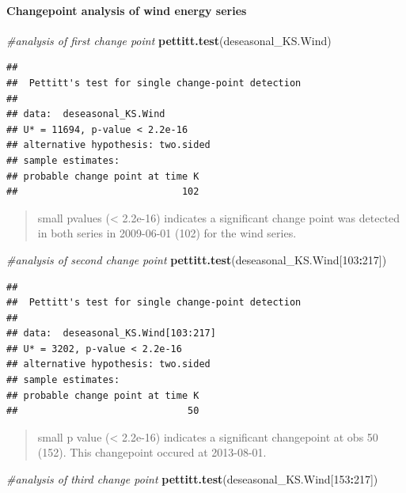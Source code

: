 \documentclass[12pt,]{article}
\newenvironment{Shaded}{\begin{snugshade}}{\end{snugshade}}
\newcommand{\KeywordTok}[1]{\textcolor[rgb]{0.13,0.29,0.53}{\textbf{#1}}}
\newcommand{\DecValTok}[1]{\textcolor[rgb]{0.00,0.00,0.81}{#1}}
\newcommand{\CommentTok}[1]{\textcolor[rgb]{0.56,0.35,0.01}{\textit{#1}}}
\newcommand{\OperatorTok}[1]{\textcolor[rgb]{0.81,0.36,0.00}{\textbf{#1}}}
\newcommand{\NormalTok}[1]{#1}
\let\oldparagraph\paragraph
\renewcommand{\paragraph}[1]{\oldparagraph{#1}\mbox{}}
\begin{document}
\paragraph{Changepoint analysis of wind energy
series}\label{changepoint-analysis-of-wind-energy-series}

\begin{Shaded}
\begin{Highlighting}[]
\CommentTok{#analysis of first change point}
\KeywordTok{pettitt.test}\NormalTok{(deseasonal_KS.Wind)}
\end{Highlighting}
\end{Shaded}

\begin{verbatim}
## 
##  Pettitt's test for single change-point detection
## 
## data:  deseasonal_KS.Wind
## U* = 11694, p-value < 2.2e-16
## alternative hypothesis: two.sided
## sample estimates:
## probable change point at time K 
##                             102
\end{verbatim}

\begin{quote}
small pvalues (\textless{} 2.2e-16) indicates a significant change point
was detected in both series in 2009-06-01 (102) for the wind series.
\end{quote}

\begin{Shaded}
\begin{Highlighting}[]
\CommentTok{#analysis of second change point}
\KeywordTok{pettitt.test}\NormalTok{(deseasonal_KS.Wind[}\DecValTok{103}\OperatorTok{:}\DecValTok{217}\NormalTok{])}
\end{Highlighting}
\end{Shaded}

\begin{verbatim}
## 
##  Pettitt's test for single change-point detection
## 
## data:  deseasonal_KS.Wind[103:217]
## U* = 3202, p-value < 2.2e-16
## alternative hypothesis: two.sided
## sample estimates:
## probable change point at time K 
##                              50
\end{verbatim}

\begin{quote}
small p value (\textless{} 2.2e-16) indicates a significant changepoint
at obs 50 (152). This changepoint occured at 2013-08-01.
\end{quote}

\begin{Shaded}
\begin{Highlighting}[]
\CommentTok{#analysis of third change point}
\KeywordTok{pettitt.test}\NormalTok{(deseasonal_KS.Wind[}\DecValTok{153}\OperatorTok{:}\DecValTok{217}\NormalTok{])}
\end{Highlighting}
\end{Shaded}
\end{document}
